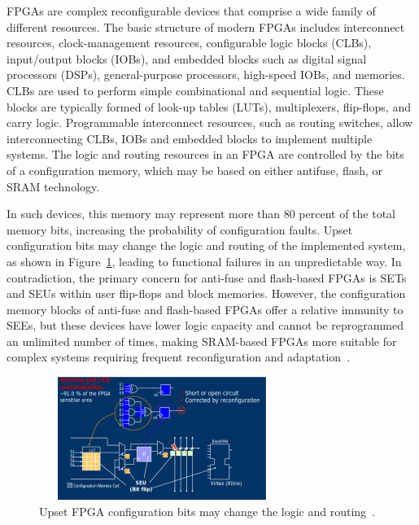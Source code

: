 FPGAs are complex reconfigurable devices that comprise a wide family of different resources. The basic structure of modern FPGAs includes interconnect resources, clock-management resources, configurable logic blocks (CLBs), input/output
blocks (IOBs), and embedded blocks such as digital signal processors (DSPs), general-purpose processors, high-speed IOBs, and memories. CLBs are used to perform simple
combinational and sequential logic. These blocks are typically formed of look-up tables
(LUTs), multiplexers, flip-flops, and carry logic. Programmable interconnect resources, such
as routing switches, allow interconnecting CLBs, IOBs and embedded blocks to implement multiple systems.
The logic and routing resources in an FPGA are controlled by the bits of a configuration memory, which may be based on either antifuse, flash, or SRAM technology. 

%
%
%


In such devices, this memory may represent more
than 80 percent of the total memory bits, increasing the probability of configuration faults.
Upset configuration bits may change the logic and routing of the implemented system, as
shown in Figure~\ref{fig:seu}, leading to functional failures in an unpredictable way. In contradiction, the primary concern for anti-fuse and flash-based FPGAs is SETs and SEUs within user flip-flops
and block memories. However, the configuration memory blocks of anti-fuse and flash-based
FPGAs offer a relative immunity to SEEs, but these devices have lower logic capacity and
cannot be reprogrammed an unlimited number of times, making SRAM-based FPGAs more
suitable for complex systems requiring frequent reconfiguration and adaptation~\cite{quinn2015validation, violante2004simulation}.

\begin{figure}
 \centering
  \captionsetup{justification=centering}    
   \includegraphics[width=8cm, height=4cm]{Figures/seu.pdf}
   \caption{Upset FPGA configuration bits may change the logic and routing~\cite{manuzzato2010single}.}
\label{fig:seu}
\end{figure}






